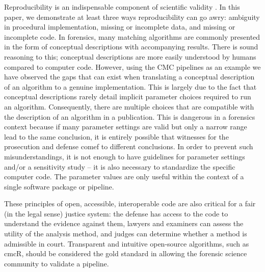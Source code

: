 \documentclass[11pt,]{isuthesis}
\begin{document}
Reproducibility is an indispensable component of scientific validity \citep{goodman_what_2016}.
In this paper, we demonstrate at least three ways reproducibility can go awry: ambiguity in procedural implementation, missing or incomplete data, and missing or incomplete code.
In forensics, many matching algorithms are commonly presented in the form of conceptual descriptions with accompanying results.
There is sound reasoning to this; conceptual descriptions are more easily understood by humans compared to computer code.
However, using the CMC pipelines as an example we have observed the gaps that can exist when translating a conceptual description of an algorithm to a genuine implementation.
This is largely due to the fact that conceptual descriptions rarely detail implicit parameter choices required to run an algorithm.
Consequently, there are multiple choices that are compatible with the description of an algorithm in a publication.
This is dangerous in a forensics context because if many parameter settings are valid but only a narrow range lead to the same conclusion, it is entirely possible that witnesses for the prosecution and defense comef to different conclusions.
In order to prevent such misunderstandings, it is not enough to have guidelines for parameter settings and/or a sensitivity study -- it is also necessary to standardize the specific computer code.
The parameter values are only useful within the context of a single software package or pipeline.

These principles of open, accessible, interoperable code are also critical for a fair (in the legal sense) justice system: the defense has access to the code to understand the evidence against them, lawyers and examiners can assess the utility of the analysis method, and judges can determine whether a method is admissible in court.
Transparent and intuitive open-source algorithms, such as cmcR, should be considered the gold standard in allowing the forensic science community to validate a pipeline.
\end{document}
